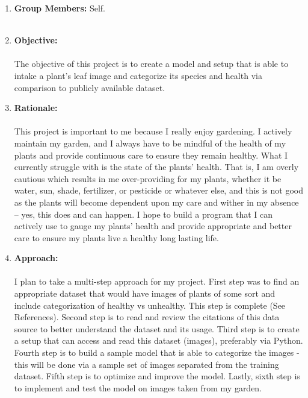\documentclass{article}
\begin{document}
\begin{enumerate}
	\item \textbf{Group Members:} Self.\\~\\
	
  	\item \textbf{Objective:}\\~\\
	
	The objective of this project is to create a model and setup that is able to intake a plant's leaf image and categorize its species and health via comparison to publicly available dataset.\\
	
	\item \textbf{Rationale:}\\~\\
	
	This project is important to me because I really enjoy gardening. I actively maintain my garden, and I always have to be mindful of the health of my plants and provide continuous care to ensure they remain healthy. What I currently struggle with is the state of the plants’ health. That is, I am overly cautious which results in me over-providing for my plants, whether it be water, sun, shade, fertilizer, or pesticide or whatever else, and this is not good as the plants will become dependent upon my care and wither in my absence – yes, this does and can happen. I hope to build a program that I can actively use to gauge my plants' health and provide appropriate and better care to ensure my plants live a healthy long lasting life.\\
	
	\item \textbf{Approach:}\\~\\
	
	I plan to take a multi-step approach for my project. First step was to find an appropriate dataset that would have images of plants of some sort and include categorization of healthy vs unhealthy. This step is complete (See References). Second step is to read and review the citations of this data source to better understand the dataset and its usage. Third step is to create a setup that can access and read this dataset (images), preferably via Python. Fourth step is to build a sample model that is able to categorize the images - this will be done via a sample set of images separated from the training dataset. Fifth step is to optimize and improve the model. Lastly, sixth step is to implement and test the model on images taken from my garden.\\
	

\end{enumerate}
\end{document}
